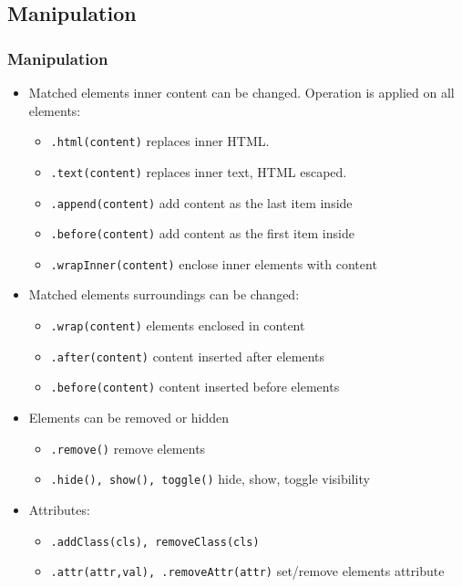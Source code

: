 \documentclass[trans,compress,xcolor=table]{beamer}
\begin{document}
\subsection*{Manipulation}
\begin{frame}[fragile]
\frametitle{Manipulation}
\begin{itemize}
\item Matched elements inner content can be changed. Operation is applied on
all elements:
\begin{itemize}
\item \lstinline!.html(content)! replaces inner HTML.
\item \lstinline!.text(content)! replaces inner text, HTML escaped.
\item \lstinline!.append(content)! add content as the last item inside
\item \lstinline!.before(content)! add content as the first item inside
\item \lstinline!.wrapInner(content)! enclose inner elements with content
\end{itemize}
\item Matched elements surroundings can be changed:
\begin{itemize}
\item \lstinline!.wrap(content)! elements enclosed in content
\item \lstinline!.after(content)! content inserted after elements
\item \lstinline!.before(content)! content inserted before elements
\end{itemize}
\item Elements can be removed or hidden
\begin{itemize}
\item \lstinline!.remove()! remove elements
\item \lstinline!.hide(), show(), toggle()! hide, show, toggle visibility
\end{itemize}
\item Attributes:
\begin{itemize}
\item \lstinline!.addClass(cls), removeClass(cls)! 
\item \lstinline!.attr(attr,val), .removeAttr(attr)! {\scriptsize set/remove elements attribute}
\end{itemize}
\end{itemize}
\end{frame}
\end{document}
